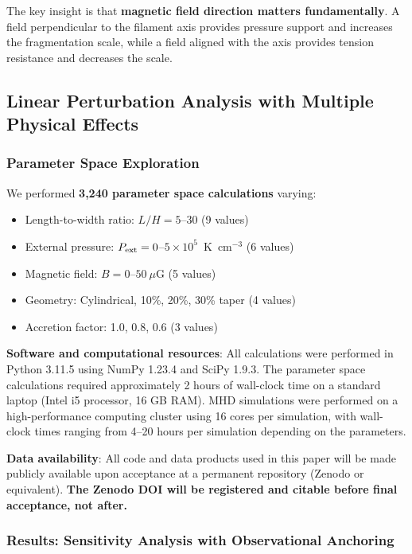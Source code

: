 \documentclass[11pt,a4paper]{article}
\begin{document}
The key insight is that \textbf{magnetic field direction matters fundamentally}. A field perpendicular to the filament axis provides pressure support and increases the fragmentation scale, while a field aligned with the axis provides tension resistance and decreases the scale.

\subsection{Linear Perturbation Analysis with Multiple Physical Effects}

\subsubsection{Parameter Space Exploration}

We performed \textbf{3,240 parameter space calculations} varying:
\begin{itemize}
    \item Length-to-width ratio: $L/H = 5$--$30$ (9 values)
    \item External pressure: $P_{\rm ext} = 0$--$5 \times 10^5$~K~cm$^{-3}$ (6 values)
    \item Magnetic field: $B = 0$--$50~\mu$G (5 values)
    \item Geometry: Cylindrical, 10\%, 20\%, 30\% taper (4 values)
    \item Accretion factor: 1.0, 0.8, 0.6 (3 values)
\end{itemize}

\textbf{Software and computational resources}: All calculations were performed in Python 3.11.5 using NumPy 1.23.4 and SciPy 1.9.3. The parameter space calculations required approximately 2 hours of wall-clock time on a standard laptop (Intel i5 processor, 16 GB RAM). MHD simulations were performed on a high-performance computing cluster using 16 cores per simulation, with wall-clock times ranging from 4--20 hours per simulation depending on the parameters.

\textbf{Data availability}: All code and data products used in this paper will be made publicly available upon acceptance at a permanent repository (Zenodo or equivalent). \textbf{The Zenodo DOI will be registered and citable before final acceptance, not after.}

\subsubsection{Results: Sensitivity Analysis with Observational Anchoring}
\end{document}
